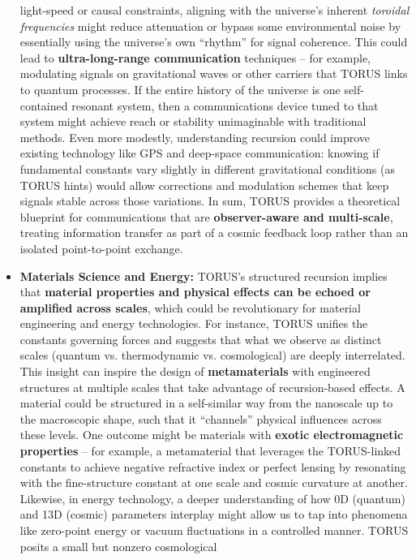 \documentclass[]{article}
\begin{document}
\begin{itemize}
  light-speed or causal constraints, aligning with the universe's
  inherent \emph{toroidal frequencies} might reduce attenuation or
  bypass some environmental noise by essentially using the universe's
  own ``rhythm'' for signal coherence. This could lead to
  \textbf{ultra-long-range communication} techniques -- for example,
  modulating signals on gravitational waves or other carriers that TORUS
  links to quantum processes. If the entire history of the universe is
  one self-contained resonant system, then a communications device tuned
  to that system might achieve reach or stability unimaginable with
  traditional methods. Even more modestly, understanding recursion could
  improve existing technology like GPS and deep-space communication:
  knowing if fundamental constants vary slightly in different
  gravitational conditions (as TORUS hints​) would allow corrections and
  modulation schemes that keep signals stable across those variations.
  In sum, TORUS provides a theoretical blueprint for communications that
  are \textbf{observer-aware and multi-scale}, treating information
  transfer as part of a cosmic feedback loop rather than an isolated
  point-to-point exchange.
\item
  \textbf{Materials Science and Energy:} TORUS's structured recursion
  implies that \textbf{material properties and physical effects can be
  echoed or amplified across scales}, which could be revolutionary for
  material engineering and energy technologies. For instance, TORUS
  unifies the constants governing forces and suggests that what we
  observe as distinct scales (quantum vs. thermodynamic vs.
  cosmological) are deeply interrelated​. This insight can inspire the
  design of \textbf{metamaterials} with engineered structures at
  multiple scales that take advantage of recursion-based effects. A
  material could be structured in a self-similar way from the nanoscale
  up to the macroscopic shape, such that it ``channels'' physical
  influences across these levels. One outcome might be materials with
  \textbf{exotic electromagnetic properties} -- for example, a
  metamaterial that leverages the TORUS-linked constants to achieve
  negative refractive index or perfect lensing by resonating with the
  fine-structure constant at one scale and cosmic curvature at another.
  Likewise, in energy technology, a deeper understanding of how 0D
  (quantum) and 13D (cosmic) parameters interplay might allow us to tap
  into phenomena like zero-point energy or vacuum fluctuations in a
  controlled manner. TORUS posits a small but nonzero cosmological

\end{itemize}
\end{document}
